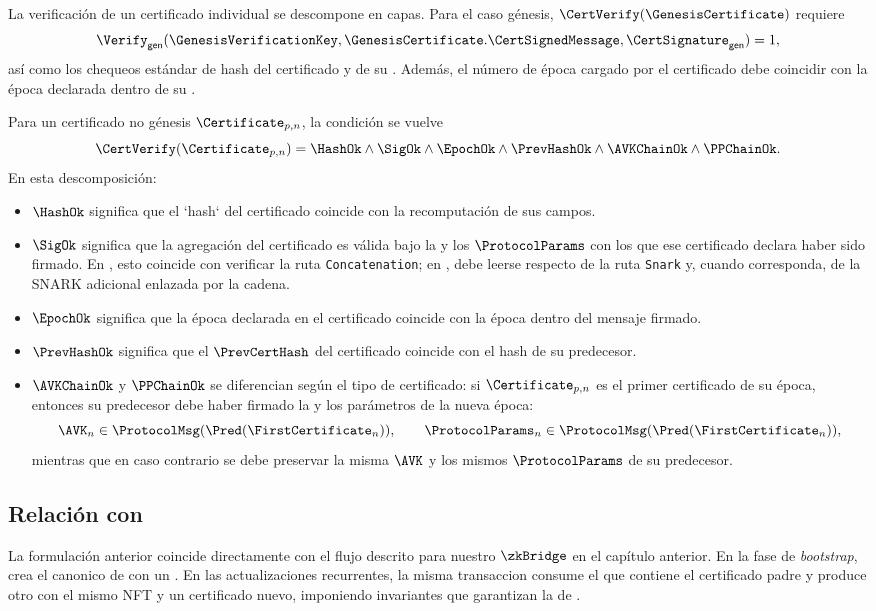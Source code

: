 La verificación de un certificado individual se descompone en capas. Para el caso génesis, $\CertVerify(\GenesisCertificate)$ requiere
$$\Verify_{\mathsf{gen}}(\GenesisVerificationKey,\GenesisCertificate.\CertSignedMessage,\CertSignature_{\mathsf{gen}})=1,$$
así como los chequeos estándar de hash del certificado y de su \ProtocolMsg. Además, el número de época cargado por el certificado debe coincidir con la época declarada dentro de su \ProtocolMsg.

Para un certificado no génesis \(\Certificate_{p,n}\), la condición se vuelve
$$\CertVerify(\Certificate_{p,n}) = \HashOk \wedge \SigOk \wedge \EpochOk \wedge \PrevHashOk \wedge \AVKChainOk \wedge \PPChainOk.$$
En esta descomposición:

\begin{itemize}[noitemsep]
	\item $\HashOk$ significa que el `hash` del certificado coincide con la recomputación de sus campos.
	\item $\SigOk$ significa que la agregación del certificado es válida bajo la \AVK y los $\ProtocolParams$ con los que ese certificado declara haber sido firmado. En \Pythagoras, esto coincide con verificar la ruta \texttt{Concatenation}; en \Lagrange, debe leerse respecto de la ruta \texttt{Snark} y, cuando corresponda, de la \AVK SNARK adicional enlazada por la cadena.
	\item $\EpochOk$ significa que la época declarada en el certificado coincide con la época dentro del mensaje firmado.
	\item $\PrevHashOk$ significa que el $\PrevCertHash$ del certificado coincide con el hash de su predecesor.
	\item $\AVKChainOk$ y $\PPChainOk$ se diferencian según el tipo de certificado: si $\Certificate_{p,n}$ es el primer certificado de su época, entonces su predecesor debe haber firmado la \AVK y los parámetros de la nueva época:
	$$\AVK_n \in \ProtocolMsg(\Pred(\FirstCertificate_{n})), \qquad \ProtocolParams_n \in \ProtocolMsg(\Pred(\FirstCertificate_{n})),$$
	mientras que en caso contrario se debe preservar la misma $\AVK$ y los mismos $\ProtocolParams$ de su predecesor.
\end{itemize}

\subsection{Relación con \texorpdfstring{\StakeDistTx}{tx\_sd}}

La formulación anterior coincide directamente con el flujo descrito para nuestro $\zkBridge$ en el capítulo anterior. En la fase de \textit{bootstrap}, \StakeDistTx crea el \UTxO canonico de \StakeDistribution con un \GenesisCertificate. En las actualizaciones recurrentes, la misma transaccion consume el \UTxO que contiene el certificado padre y produce otro con el mismo NFT y un certificado nuevo, imponiendo invariantes que garantizan la \CertificateChain de \Mithril.
